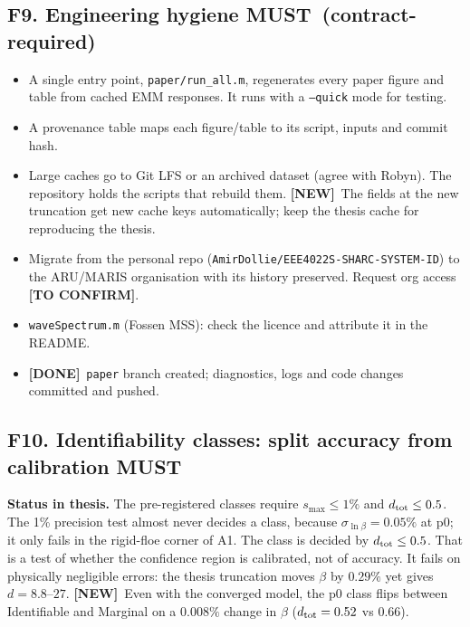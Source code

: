 \documentclass[10pt,a4paper]{article}
\newcommand{\MUST}{\textcolor{must}{\textbf{MUST}}}
\newcommand{\DONE}{\textcolor{done}{\textbf{[DONE]}}}
\newcommand{\CONFIRM}{\textcolor{part}{\textbf{[TO CONFIRM]}}}
\newcommand{\NEW}{\textcolor{ocean}{\textbf{[NEW]}}}
\begin{document}
\subsection*{F9. Engineering hygiene \MUST\ (contract-required)}
\begin{itemize}
\item A single entry point, \texttt{paper/run\_all.m}, regenerates every paper figure and table from cached EMM responses. It runs with a \texttt{--quick} mode for testing.
\item A provenance table maps each figure/table to its script, inputs and commit hash.
\item Large caches go to Git LFS or an archived dataset (agree with Robyn). The repository holds the scripts that rebuild them. \NEW\ The fields at the new truncation get new cache keys automatically; keep the thesis cache for reproducing the thesis.
\item Migrate from the personal repo (\texttt{AmirDollie/EEE4022S-SHARC-SYSTEM-ID}) to the ARU/MARIS organisation with its history preserved. Request org access \CONFIRM.
\item \texttt{waveSpectrum.m} (Fossen MSS): check the licence and attribute it in the README.
\item \DONE\ \texttt{paper} branch created; diagnostics, logs and code changes committed and pushed.
\end{itemize}

\subsection*{F10. Identifiability classes: split accuracy from calibration \MUST}
\textbf{Status in thesis.} The pre-registered classes require $s_{\max}\le1\%$ and $d_{\rm tot}\le0.5$. The 1\% precision test almost never decides a class, because $\sigma_{\ln\beta}=0.05\%$ at p0; it only fails in the rigid-floe corner of A1. The class is decided by $d_{\rm tot}\le0.5$. That is a test of whether the confidence region is calibrated, not of accuracy. It fails on physically negligible errors: the thesis truncation moves $\beta$ by $0.29\%$ yet gives $d=8.8$--$27$. \NEW\ Even with the converged model, the p0 class flips between Identifiable and Marginal on a $0.008\%$ change in $\beta$ ($d_{\rm tot}=0.52$ vs $0.66$).
\end{document}
